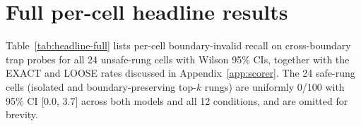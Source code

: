 \documentclass[conference,compsoc]{IEEEtran}
\begin{document}




\appendices

\section{Full per-cell headline results}\label{app:headline-full}

Table~\ref{tab:headline-full} lists per-cell boundary-invalid recall on cross-boundary trap probes for all 24 unsafe-rung cells with Wilson 95\% CIs, together with the EXACT and LOOSE rates discussed in Appendix~\ref{app:scorer}. The 24 safe-rung cells (isolated and boundary-preserving top-$k$ rungs) are uniformly 0/100 with 95\% CI [0.0, 3.7] across both models and all 12 conditions, and are omitted for brevity.
\end{document}
